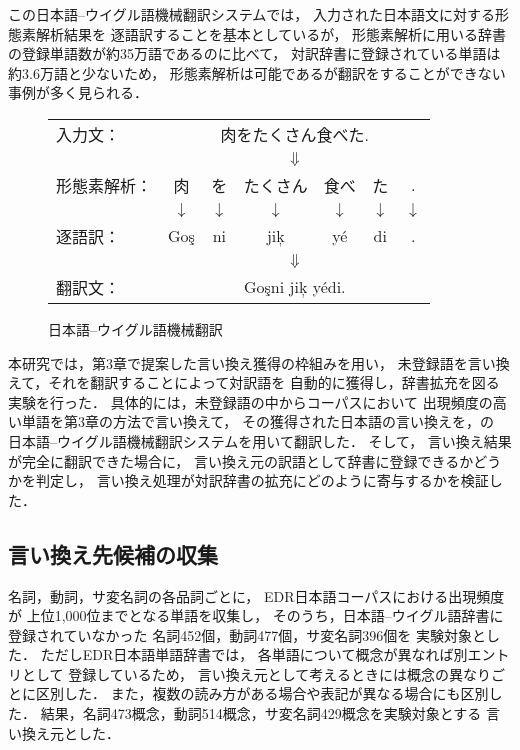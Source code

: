 この日本語--ウイグル語機械翻訳システムでは，
入力された日本語文に対する形態素解析結果を
逐語訳することを基本としているが，
形態素解析に用いる辞書の登録単語数が約35万語であるのに比べて，
対訳辞書に登録されている単語は約3.6万語と少ないため，
形態素解析は可能であるが翻訳をすることができない事例が多く見られる．

 \begin{figure}[tb]
  \begin{center}
   \begin{tabular}{lcccccc}
	入力文：     & \multicolumn{6}{c}{肉をたくさん食べた.} \\
	& \multicolumn{6}{c}{$\Downarrow$} \\
	形態素解析： & 肉 & を & たくさん & 食べ & た & . \\
	& $\downarrow$ & $\downarrow$ & $\downarrow$ & $\downarrow$
	& $\downarrow$ & $\downarrow$ \\
	逐語訳：     & Go\c{s} & ni & ji\c{k} & y\'e & di & .\\
	& \multicolumn{6}{c}{$\Downarrow$} \\
	翻訳文：     & \multicolumn{6}{c}{Go\c{s}ni ji\c{k} y\'edi.} \\
   \end{tabular}
  \end{center}
  \caption{\label{ujtrance}日本語--ウイグル語機械翻訳}
 \end{figure}
  

本研究では，第3章で提案した言い換え獲得の枠組みを用い，
未登録語を言い換えて，それを翻訳することによって対訳語を
自動的に獲得し，辞書拡充を図る実験を行った．
具体的には，未登録語の中からコーパスにおいて
出現頻度の高い単語を第3章の方法で言い換えて，
その獲得された日本語の言い換えを，\cite{ogawa}の
日本語--ウイグル語機械翻訳システムを用いて翻訳した．
そして，
言い換え結果が完全に翻訳できた場合に，
言い換え元の訳語として辞書に登録できるかどうかを判定し，
言い換え処理が対訳辞書の拡充にどのように寄与するかを検証した．


\subsection{言い換え先候補の収集}
名詞，動詞，サ変名詞の各品詞ごとに，
EDR日本語コーパス\cite{edrdic}における出現頻度が
上位1,000位までとなる単語を収集し，
そのうち，日本語--ウイグル語辞書に登録されていなかった
名詞452個，動詞477個，サ変名詞396個を
実験対象とした．
ただしEDR日本語単語辞書では，
各単語について概念が異なれば別エントリとして
登録しているため，
言い換え元として考えるときには概念の異なりごとに区別した．
また，複数の読み方がある場合や表記が異なる場合にも区別した．
結果，名詞473概念，動詞514概念，サ変名詞429概念を実験対象とする
言い換え元とした．

